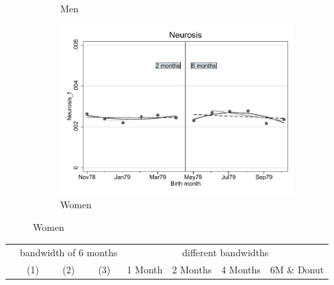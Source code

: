 \documentclass[a4paper ]{article}
\begin{document}
\begin{figure}[h]
\begin{subfigure}[t]{0.31\textwidth}
		\caption{Men}		
	\end{subfigure}
	\quad
	\begin{subfigure}[t]{0.31\textwidth}
		\centering
		\includegraphics[width=0.99\textwidth]{R1_RD_Neurosis_f_fits}
		\caption{Women}
	\end{subfigure}
\end{figure}


\begin{table}[h]\centering
\def\sym#1{\ifmmode^{#1}\else\(^{#1}\)\fi}
\begin{tabular}{l*{3}{c}|cccc}
\toprule
&\multicolumn{3}{c}{bandwidth of 6 months} & \multicolumn{4}{c}{different bandwidths} \\
 \cmidrule(lr{1em}){2-4} \cmidrule(lr{1em}){5-8}
 &\multicolumn{1}{c}{(1)}&\multicolumn{1}{c}{(2)}&\multicolumn{1}{c}{(3)}& 1 Month & 2 Months & 4 Months & 6M \& Donut \\
\midrule 

\bottomrule
\end{tabular}
\end{table}
\end{document}
